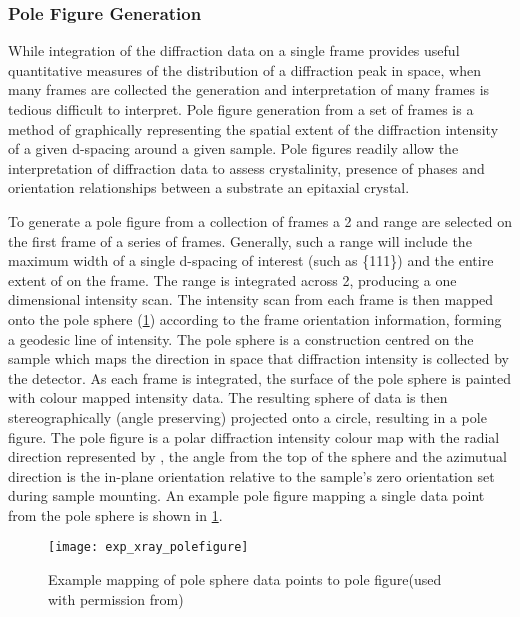 \subsubsection{Pole Figure Generation}
While integration of the diffraction data on a single frame provides useful quantitative measures of the distribution of a diffraction peak in space, when many frames are collected the generation and interpretation of many frames is tedious difficult to interpret. Pole figure generation from a set of frames is a method of graphically representing the spatial extent of the diffraction intensity of a given d-spacing around a given sample. Pole figures readily allow the interpretation of diffraction data to assess crystalinity, presence of phases and orientation relationships between a substrate an epitaxial crystal.

To generate a pole figure from a collection of frames a 2\straighttheta{} and \textchi{} range are selected on the first frame of a series of frames. Generally, such a range will include the maximum width of a single d-spacing of interest (such as \{111\}) and the entire extent of \textchi{} on the frame. The range is integrated across 2\straighttheta{}, producing a one dimensional intensity scan. The intensity scan from each frame is then mapped onto the pole sphere (\cref{fig:exp_xray_polefigure}) according to the frame orientation information, forming a geodesic line of intensity. The pole sphere is a construction centred on the sample which maps the direction in space that diffraction intensity is collected by the detector. As each frame is integrated, the surface of the pole sphere is painted with colour mapped intensity data. The resulting sphere of data is then stereographically (angle preserving) projected onto a circle, resulting in a pole figure\cite{He2009}. The pole figure is a polar diffraction intensity colour map with the radial direction represented by \textalpha{}, the angle from the top of the sphere and the azimutual direction \textphi{} is the in-plane orientation relative to the sample's \textphi{} zero orientation set during sample mounting. An example pole figure mapping a single data point from the pole sphere is shown in \cref{fig:exp_xray_polefigure}. 
\begin{figure}
    \centering
    \texttt{[image: exp\_xray\_polefigure]}
    \caption[Mapping of pole sphere to pole figure]{\label{fig:exp_xray_polefigure}Example mapping of pole sphere data points to pole figure(used with permission from\cite{He2009})}
\end{figure}

